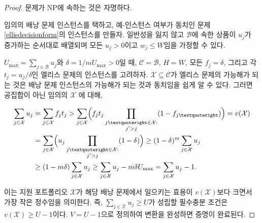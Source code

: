 \documentclass[11pt]{article} %
\newif\ifen
\theoremstyle{definition}
\theoremstyle{definition}
\begin{document}
\begin{proof}
\ifen It is obvious that the problem is in NP.
\else 문제가 NP에 속하는 것은 자명하다.\fi

\ifen
Consider an instance of the knapsack problem, and we will construct an instance of Problem \ref{ellisdecisionform} that is a yes-instance if and only if the corresponding knapsack instance is a yes-instance. Without loss of generality, we may assume that the objects in $\mathcal{B}$ are indexed in increasing order of $u_j$, that each $u_j >0$, and that each $w_j \leq W$. 
\else
임의의 배낭 문제 인스턴스를 택하고, 예-인스턴스 여부가 동치인 문제 \ref{ellisdecisionform}의 인스턴스를 만들자. 일반성을 잃지 않고 $\mathcal{B}$에 속한 상품이 $u_j$가 증가하는 순서대로 배열되며 모든 $u_j >0$이고 $w_j \leq W$임을 가정할 수 있다.
\fi

\ifen
Let $U_{\mathrm{max}} = \sum_{j \in \mathcal{B}} u_j$ and $\delta = {1} /{m U_{\mathrm{max}}} > 0$, and construct an instance of Ellis’s problem with $\mathcal{C} = \mathcal{B}$, $H = W$, all $f_j = \delta$, and each $t_j = u_j / \delta$. Clearly, $\mathcal{X} \subseteq \mathcal{C}$ is feasible for Ellis’s problem if and only if it is feasible for the knapsack instance. Now, we observe that for any nonempty $\mathcal{X}$,
\else
$U_{\mathrm{max}} = \sum_{j \in \mathcal{B}} u_j$와 $\delta = {1} /{m U_{\mathrm{max}}} > 0$일 때, $\mathcal{C} = \mathcal{B}$, $H = W$,  모든 $f_j = \delta$, 그리고 각 $t_j = u_j / \delta$인 엘리스 문제의 인스턴스를 고려하자. $\mathcal{X} \subseteq \mathcal{C}$가 엘리스 문제의 가능해가 되는 것은 배낭 문제 인스턴스의 가능해가 되는 것과 동치임을 쉽게 알 수 있다. 그러면 공집합이 아닌 임의의 $\mathcal{X}$ 에 대해,
\fi
\begin{align}
\begin{split}
\sum_{j \in \mathcal{X}} u_j &=  \sum_{j \in \mathcal{X}} f_j t_j
> \sum_{j \in \mathcal{X}} \Bigl( f_j t_j \prod_{\substack{j’ \in \mathcal{X}: \\ j' > j}} (1 - f_{j’}) \Bigr)
= v(\mathcal{X}) \\
&= \sum_{j \in \mathcal{X}} \Bigl( u_j  \prod_{\substack{j’ \in \mathcal{X}: \\ j' > j}} (1 - \delta) \Bigr)
\geq (1 - \delta)^m \sum_{j \in \mathcal{X}} u_j \\
&\geq (1 - m\delta) \sum_{j \in \mathcal{X}} u_j 
\geq \sum_{j \in \mathcal{X}} u_j  - m\delta U_{\mathrm{max}}
= \sum_{j \in \mathcal{X}} u_j  - 1.
\end{split}
\end{align}
\ifen
This means that the utility of an application portfolio $\mathcal{X}$ in the corresponding knapsack instance is the smallest integer greater than $v( \mathcal{X})$. That is, $\sum_{j \in \mathcal{X}} u_j \geq U$ if and only if $v(\mathcal{X}) \geq U -1$. Taking $V = U-1$ completes the transformation and concludes the proof. 
\else
이는 지원 포트폴리오 $\mathcal{X}$가 해당 배낭 문제에서 일으키는 효용이 $v( \mathcal{X})$보다 크면서 가장 작은 정수임을 의미한다. 즉, $\sum_{j \in \mathcal{X}} u_j \geq U$가 성립할 필수충분 조건은 $v(\mathcal{X}) \geq U -1$이다. $V = U-1$으로 정의하여 변환을 완성하면 증명이 완료된다.
\fi
\end{proof}
\end{document}
